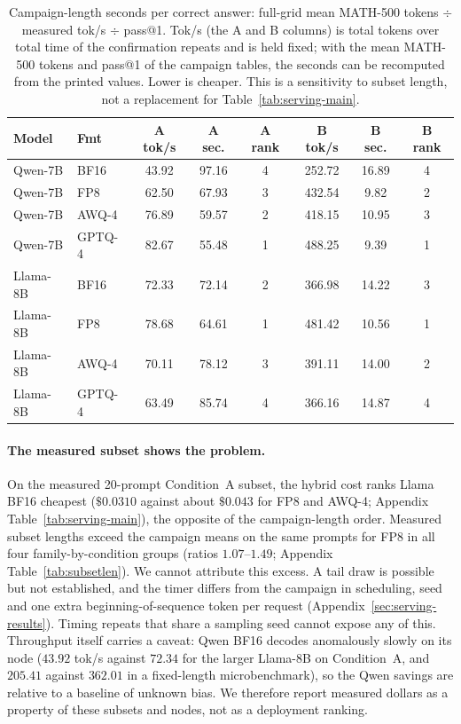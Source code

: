 \documentclass[11pt,a4paper]{article}
\begin{document}
\begin{table}[t]
\centering
\caption{Campaign-length seconds per correct answer: full-grid mean MATH-500 tokens $\div$ measured tok/s $\div$ pass@1. Tok/s (the A and B columns) is total tokens over total time of the confirmation repeats and is held fixed; with the mean MATH-500 tokens and pass@1 of the campaign tables, the seconds can be recomputed from the printed values. Lower is cheaper. This is a sensitivity to subset length, not a replacement for Table~\ref{tab:serving-main}.}
\label{tab:length-cost}
\small
\begin{tabular}{llcccccc}
\toprule
\textbf{Model} & \textbf{Fmt} & \textbf{A tok/s} & \textbf{A sec.} & \textbf{A rank} & \textbf{B tok/s} & \textbf{B sec.} & \textbf{B rank} \\
\midrule
Qwen-7B & BF16 & 43.92 & 97.16 & 4 & 252.72 & 16.89 & 4 \\
Qwen-7B & FP8 & 62.50 & 67.93 & 3 & 432.54 & 9.82 & 2 \\
Qwen-7B & AWQ-4 & 76.89 & 59.57 & 2 & 418.15 & 10.95 & 3 \\
Qwen-7B & GPTQ-4 & 82.67 & 55.48 & 1 & 488.25 & 9.39 & 1 \\
Llama-8B & BF16 & 72.33 & 72.14 & 2 & 366.98 & 14.22 & 3 \\
Llama-8B & FP8 & 78.68 & 64.61 & 1 & 481.42 & 10.56 & 1 \\
Llama-8B & AWQ-4 & 70.11 & 78.12 & 3 & 391.11 & 14.00 & 2 \\
Llama-8B & GPTQ-4 & 63.49 & 85.74 & 4 & 366.16 & 14.87 & 4 \\
\bottomrule
\end{tabular}
\end{table}

\paragraph{The measured subset shows the problem.} On the measured 20-prompt Condition~A subset, the hybrid cost ranks Llama BF16 cheapest ($\$0.0310$ against about $\$0.043$ for FP8 and AWQ-4; Appendix Table~\ref{tab:serving-main}), the opposite of the campaign-length order. Measured subset lengths exceed the campaign means on the same prompts for FP8 in all four family-by-condition groups (ratios $1.07$--$1.49$; Appendix Table~\ref{tab:subsetlen}). We cannot attribute this excess. A tail draw is possible but not established, and the timer differs from the campaign in scheduling, seed and one extra beginning-of-sequence token per request (Appendix~\ref{sec:serving-results}). Timing repeats that share a sampling seed cannot expose any of this. Throughput itself carries a caveat: Qwen BF16 decodes anomalously slowly on its node ($43.92$ tok/s against $72.34$ for the larger Llama-8B on Condition~A, and $205.41$ against $362.01$ in a fixed-length microbenchmark), so the Qwen savings are relative to a baseline of unknown bias. We therefore report measured dollars as a property of these subsets and nodes, not as a deployment ranking.
\end{document}
